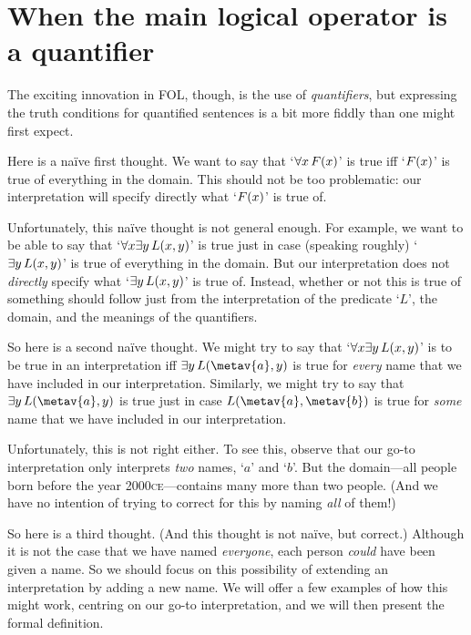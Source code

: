 \section[Quantifiers]{When the main logical operator is a quantifier}\label{s:MainLogicalOperatorQuantifier}
The exciting innovation in FOL, though, is the use of \emph{quantifiers}, but expressing the truth conditions for quantified sentences is a bit more fiddly than one might first expect.

Here is a na\"{i}ve first thought. We want to say that `$\forall x\, \mathord{F}(x)$' is true iff `$\mathord{F}(x)$' is true of everything in the domain. This should not be too problematic: our interpretation will specify directly what `$\mathord{F}(x)$' is true of.

Unfortunately, this na\"{i}ve thought is not general enough. For example, we want to be able to say that `$\forall x \exists y\, \mathord{L}(x,y)$' is true just in case (speaking roughly) `$\exists y\, \mathord{L}(x,y)$' is true of everything in the domain. But our interpretation does not \emph{directly} specify what `$\exists y\, \mathord{L}(x,y)$' is true of. Instead, whether or not this is true of something should follow just from the interpretation of the predicate `$L$', the domain, and the meanings of the quantifiers.

So here is a second na\"{i}ve thought. We might try to say that `$\forall x \exists y\, \mathord{L}(x,y)$' is to be true in an interpretation iff $\exists y\, \atom{L}{\metav{a},y}$ is true for \emph{every} name  that we have included in our interpretation. Similarly, we might try to say that $\exists y\, \atom{L}{\metav{a},y}$ is true just in case $\atom{L}{\metav{a},\metav{b}}$ is true for \emph{some} name  that we have included in our interpretation.

Unfortunately, this is not right either. To see this, observe that our go-to interpretation only interprets \emph{two} names, `$a$' and `$b$'. But the domain---all people born before the year 2000\textsc{ce}---contains many more than two people. (And we have no intention of trying to correct for this by naming \emph{all} of them!)

So here is a third thought. (And this thought is not na\"{i}ve, but correct.) Although it is not the case that we have named \emph{everyone}, each person \emph{could} have been given a name. So we should focus on this possibility of extending an interpretation by adding a new name. We will offer a few examples of how this might work, centring on our go-to interpretation, and we will then present the formal definition.

